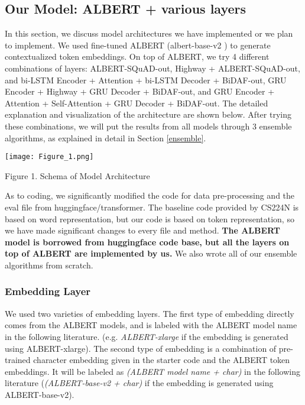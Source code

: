 \documentclass{article}
\begin{document}
\subsection{Our Model: ALBERT + various layers} \label{modules}
In this section, we discuss model architectures we have implemented or we plan to implement. We used fine-tuned ALBERT (albert-base-v2 \citep{albert}) to generate contextualized token embeddings. On top of ALBERT, we try 4 different combinations of layers: ALBERT-SQuAD-out, Highway + ALBERT-SQuAD-out, and bi-LSTM Encoder + Attention + bi-LSTM Decoder + BiDAF-out, GRU Encoder + Highway + GRU Decoder + BiDAF-out, and GRU Encoder + Attention + Self-Attention + GRU Decoder + BiDAF-out. The detailed explanation and visualization of the architecture are shown below. After trying these combinations, we will put the results from all models through 3 ensemble algorithms, as explained in detail in Section \ref{ensemble}.

\begin{center}
    \texttt{[image: Figure\_1.png]}

Figure 1. Schema of Model Architecture
\end{center}

As to coding, we significantly modified the code for data pre-processing and the eval file from huggingface/transformer. \citep{pre_processing} The baseline code provided by CS224N is based on word representation, but our code is based on token representation, so we have made significant changes to every file and method. \textbf{The ALBERT model is borrowed from huggingface code base, but all the layers on top of ALBERT are implemented by us.} We also wrote all of our ensemble algorithms from scratch.

\subsubsection{Embedding Layer}
We used two varieties of embedding layers. The first type of embedding directly comes from the ALBERT models, and is labeled with the ALBERT model name in the following literature. (e.g. \textit{ALBERT-xlarge} if the embedding is generated using ALBERT-xlarge). The second type of embedding is a combination of pre-trained character embedding given in the starter code and the ALBERT token embeddings. It will be labeled as \textit{(ALBERT model name + char)} in the following literature (\textit{(ALBERT-base-v2 + char)} if the embedding is generated using ALBERT-base-v2). 
\end{document}

